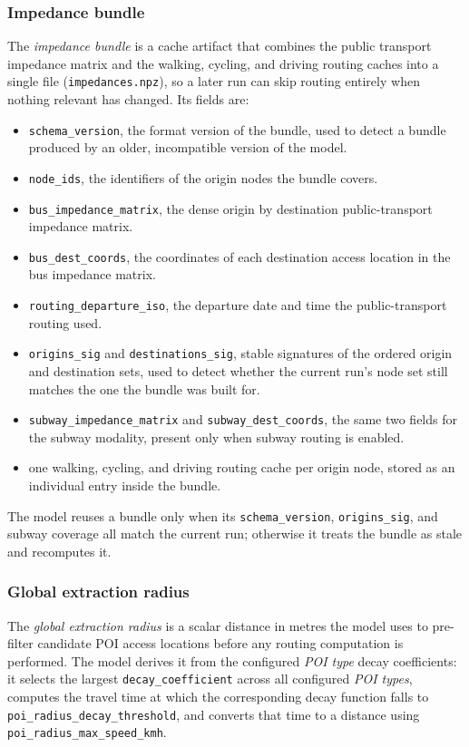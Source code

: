 \documentclass{article}
\begin{document}
\subsubsection*{Impedance bundle}
    The \emph{impedance bundle} is a cache artifact that combines the public
    transport impedance matrix and the walking, cycling, and driving routing
    caches into a single file (\texttt{impedances.npz}), so a later run can
    skip routing entirely when nothing relevant has changed. Its fields are:
    \begin{itemize}
        \item \texttt{schema\_version}, the format version of the bundle, used
        to detect a bundle produced by an older, incompatible version of the
        model.
        \item \texttt{node\_ids}, the identifiers of the origin nodes the
        bundle covers.
        \item \texttt{bus\_impedance\_matrix}, the dense origin by destination
        public-transport impedance matrix.
        \item \texttt{bus\_dest\_coords}, the coordinates of each destination
        access location in the bus impedance matrix.
        \item \texttt{routing\_departure\_iso}, the departure date and time
        the public-transport routing used.
        \item \texttt{origins\_sig} and \texttt{destinations\_sig}, stable
        signatures of the ordered origin and destination sets, used to detect
        whether the current run's node set still matches the one the bundle
        was built for.
        \item \texttt{subway\_impedance\_matrix} and
        \texttt{subway\_dest\_coords}, the same two fields for the subway
        modality, present only when subway routing is enabled.
        \item one walking, cycling, and driving routing cache per origin
        node, stored as an individual entry inside the bundle.
    \end{itemize}
    The model reuses a bundle only when its \texttt{schema\_version},
    \texttt{origins\_sig}, and subway coverage all match the current run;
    otherwise it treats the bundle as stale and recomputes it.

\subsubsection*{Global extraction radius}
    The \emph{global extraction radius} is a scalar distance in metres the
    model uses to pre-filter candidate POI access locations before any
    routing computation is performed. The model derives it from the
    configured \emph{POI type} decay coefficients: it selects the largest
    \texttt{decay\_coefficient} across all configured \emph{POI types},
    computes the travel time at which the corresponding decay function falls
    to \texttt{poi\_radius\_decay\_threshold}, and converts that time to a
    distance using \texttt{poi\_radius\_max\_speed\_kmh}.
\end{document}
